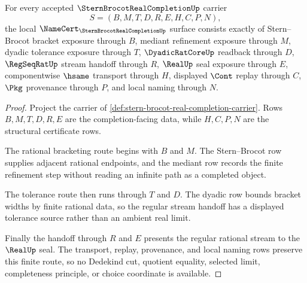 \begin{theorem}
\label{thm:stern-brocot-real-completion-namecert-obligations}
For every accepted $\SternBrocotRealCompletionUp$ carrier
$$
S=(B,M,T,D,R,E,H,C,P,N),
$$
the local $\NameCert_{\SternBrocotRealCompletionUp}$ surface consists exactly of Stern--Brocot bracket exposure through $B$, mediant refinement exposure through $M$, dyadic tolerance exposure through $T$, $\DyadicRatCoreUp$ readback through $D$, $\RegSeqRatUp$ stream handoff through $R$, $\RealUp$ seal exposure through $E$, componentwise $\hsame$ transport through $H$, displayed $\Cont$ replay through $C$, $\Pkg$ provenance through $P$, and local naming through $N$.
\end{theorem}
\begin{proof}
Project the carrier of \autoref{def:stern-brocot-real-completion-carrier}. Rows $B,M,T,D,R,E$ are the completion-facing data, while $H,C,P,N$ are the structural certificate rows.

The rational bracketing route begins with $B$ and $M$. The Stern--Brocot row supplies adjacent rational endpoints, and the mediant row records the finite refinement step without reading an infinite path as a completed object.

The tolerance route then runs through $T$ and $D$. The dyadic row bounds bracket widths by finite rational data, so the regular stream handoff has a displayed tolerance source rather than an ambient real limit.

Finally the handoff through $R$ and $E$ presents the regular rational stream to the $\RealUp$ seal. The transport, replay, provenance, and local naming rows preserve this finite route, so no Dedekind cut, quotient equality, selected limit, completeness principle, or choice coordinate is available.
\end{proof}

